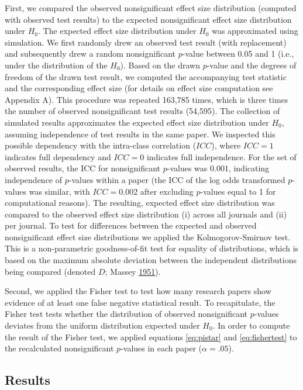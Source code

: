\documentclass[a5paper]{book}
\begin{document}
First, we compared the observed nonsignificant effect size distribution
(computed with observed test results) to the expected nonsignificant
effect size distribution under \(H_0\). The expected effect size
distribution under \(H_0\) was approximated using simulation. We first
randomly drew an observed test result (with replacement) and
subsequently drew a random nonsignificant \(p\)-value between 0.05 and 1
(i.e., under the distribution of the \(H_0\)). Based on the drawn
\(p\)-value and the degrees of freedom of the drawn test result, we
computed the accompanying test statistic and the corresponding effect
size (for details on effect size computation see Appendix A). This
procedure was repeated 163,785 times, which is three times the number of
observed nonsignificant test results (54,595). The collection of
simulated results approximates the expected effect size distribution
under \(H_0\), assuming independence of test results in the same paper.
We inspected this possible dependency with the intra-class correlation
(\(ICC\)), where \(ICC=1\) indicates full dependency and \(ICC=0\)
indicates full independence. For the set of observed results, the ICC
for nonsignificant \(p\)-values was 0.001, indicating independence of
\(p\)-values within a paper (the ICC of the log odds transformed
\(p\)-values was similar, with \(ICC=0.002\) after excluding
\(p\)-values equal to 1 for computational reasons). The resulting,
expected effect size distribution was compared to the observed effect
size distribution (i) across all journals and (ii) per journal. To test
for differences between the expected and observed nonsignificant effect
size distributions we applied the Kolmogorov-Smirnov test. This is a
non-parametric goodness-of-fit test for equality of distributions, which
is based on the maximum absolute deviation between the independent
distributions being compared (denoted \(D\); Massey
\protect\hyperlink{ref-doi:10.2307ux2f2280095}{1951}).

Second, we applied the Fisher test to test how many research papers show
evidence of at least one false negative statistical result. To
recapitulate, the Fisher test tests whether the distribution of observed
nonsignificant \(p\)-values deviates from the uniform distribution
expected under \(H_0\). In order to compute the result of the Fisher
test, we applied equations \eqref{eq:pistar} and \eqref{eq:fishertest} to
the recalculated nonsignificant \(p\)-values in each paper
(\(\alpha=.05\)).

\subsection{Results}\label{results}
\end{document}
